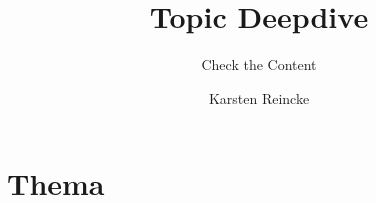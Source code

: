 \documentclass[
  DIV=calc,
  BCOR=5mm,
  11pt,
  headings=small,
  oneside,
  abstract=true,
  toc=bib,
  english,ngerman]{scrartcl}
\def\bibGl{../../../../bib.gl}
\def\cfgGl{../../../../cfg.gl/}
\def\cfgLf{../../../cfg.lf}
\begin{document}
\nocite{*}

\titlehead{Ausbildung zur Fachinformatikerin}
\subject{Release }
\title{Topic Deepdive}

\subtitle{Check the Content}
\author{Karsten Reincke}

\maketitle


\section{Thema}





\printnomenclature
\end{document}
